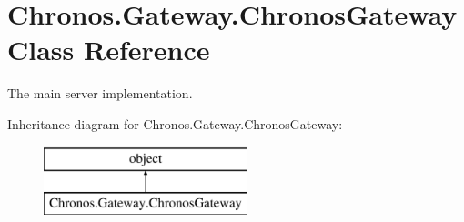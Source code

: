 \hypertarget{classChronos_1_1Gateway_1_1ChronosGateway}{}\section{Chronos.\+Gateway.\+Chronos\+Gateway Class Reference}
\label{classChronos_1_1Gateway_1_1ChronosGateway}


The main server implementation.  


Inheritance diagram for Chronos.\+Gateway.\+Chronos\+Gateway\+:\begin{figure}[H]
\begin{center}
\leavevmode
\includegraphics[height=2.000000cm]{classChronos_1_1Gateway_1_1ChronosGateway}
\end{center}
\end{figure}
